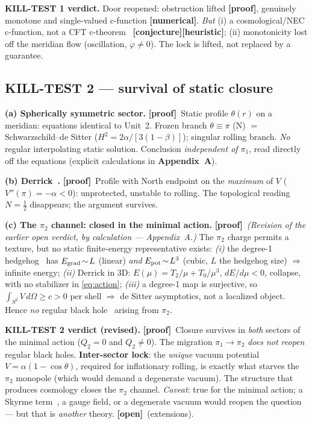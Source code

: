 \documentclass[11pt]{article}
\newcommand{\preuve}{{\small\textbf{[proof]}}}
\newcommand{\num}{{\small\textbf{[numerical]}}}
\newcommand{\conj}{{\small\textbf{[conjecture]}}}
\newcommand{\heur}{{\small\textbf{[heuristic]}}}
\newcommand{\ouv}{{\small\textbf{[open]}}}
\newcommand{\Npole}{\mathrm{N}}
\theoremstyle{definition}
\begin{document}
\textbf{KILL-TEST 1 verdict.} Door reopened: obstruction lifted \preuve, genuinely monotone and
single-valued c-function \num. \emph{But} (i) a cosmological/NEC c-function, not a CFT c-theorem~\cite{Zamolodchikov1986,Cardy1988,KomargodskiSchwimmer2011}
\conj\heur; (ii) monotonicity lost off the meridian flow (oscillation, $\dot\varphi\ne0$). The lock is
lifted, not replaced by a guarantee.

\subsection{KILL-TEST 2 --- survival of static closure}\label{sec:kt2}
\textbf{(a) Spherically symmetric sector.} \preuve\ Static profile $\theta(r)$ on a meridian: equations
identical to Unit~2. Frozen branch $\theta\equiv\pi$ ($\Npole$) $=$ Schwarzschild--de Sitter
($H^2=2\alpha/[3(1-\beta)]$); singular rolling branch. \emph{No} regular interpolating static solution.
Conclusion \emph{independent of $\pi_1$}, read directly off the equations (explicit calculations in
\textbf{Appendix~A}).

\textbf{(b) Derrick~\cite{Derrick1964}.} \preuve\ Profile with North endpoint on the \emph{maximum} of $V$
($V''(\pi)=-\alpha<0$): unprotected, unstable to rolling. The topological reading $N=\tfrac12$
disappears; the argument survives.

\textbf{(c) The $\pi_2$ channel: closed in the minimal action.} \preuve\ \emph{(Revision of the earlier
open verdict, by calculation --- Appendix~A.)} The $\pi_2$ charge permits a texture, but no static
finite-energy representative exists: \emph{(i)} the degree-1 hedgehog~\cite{BelavinPolyakov1975,BarriolaVilenkin1989} has
$E_{\rm grad}\!\sim\!L$ (linear) \emph{and} $E_{\rm pot}\!\sim\!L^3$ (cubic, $L$ the hedgehog size) $\Rightarrow$ infinite
energy; \emph{(ii)} Derrick in 3D: $E(\mu)=T_2/\mu+T_0/\mu^3$, $dE/d\mu<0$, collapse, with no
stabilizer in \eqref{eq:action}; \emph{(iii)} a degree-1 map is surjective, so
$\int_{S^2}V\,d\Omega\ge c>0$ per shell $\Rightarrow$ de Sitter asymptotics, not a localized object.
Hence \emph{no} regular black hole~\cite{Bardeen1968,Hayward2006} arising from $\pi_2$.

\textbf{KILL-TEST 2 verdict (revised).} \preuve\ Closure survives in \emph{both} sectors of the minimal
action ($Q_2=0$ and $Q_2\ne0$). The migration $\pi_1\to\pi_2$ \emph{does not reopen} regular black holes.
\textbf{Inter-sector lock}: the \emph{unique} vacuum potential $V=\alpha(1-\cos\theta)$, required for
inflationary rolling, is exactly what starves the $\pi_2$ monopole (which would demand a degenerate
vacuum). The structure that produces cosmology closes the $\pi_2$ channel. \emph{Caveat}: true for the
minimal action; a Skyrme term~\cite{Skyrme1961}, a gauge field, or a degenerate vacuum would reopen the
question --- but that is \emph{another} theory. \ouv\ (extensions).
\end{document}
